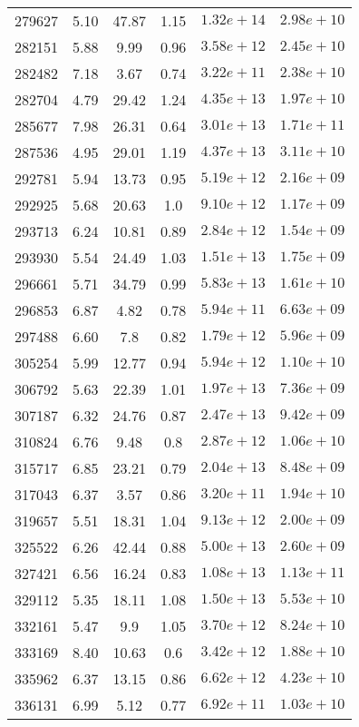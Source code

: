 \begin{table}
\begin{tabular}{cccccc}
279627 & 5.10 & 47.87 & 1.15 & $1.32e+14$ & $2.98e+10$ \\
282151 & 5.88 & 9.99 & 0.96 & $3.58e+12$ & $2.45e+10$ \\
282482 & 7.18 & 3.67 & 0.74 & $3.22e+11$ & $2.38e+10$ \\
282704 & 4.79 & 29.42 & 1.24 & $4.35e+13$ & $1.97e+10$ \\
285677 & 7.98 & 26.31 & 0.64 & $3.01e+13$ & $1.71e+11$ \\
287536 & 4.95 & 29.01 & 1.19 & $4.37e+13$ & $3.11e+10$ \\
292781 & 5.94 & 13.73 & 0.95 & $5.19e+12$ & $2.16e+09$ \\
292925 & 5.68 & 20.63 & 1.0 & $9.10e+12$ & $1.17e+09$ \\
293713 & 6.24 & 10.81 & 0.89 & $2.84e+12$ & $1.54e+09$ \\
293930 & 5.54 & 24.49 & 1.03 & $1.51e+13$ & $1.75e+09$ \\
296661 & 5.71 & 34.79 & 0.99 & $5.83e+13$ & $1.61e+10$ \\
296853 & 6.87 & 4.82 & 0.78 & $5.94e+11$ & $6.63e+09$ \\
297488 & 6.60 & 7.8 & 0.82 & $1.79e+12$ & $5.96e+09$ \\
305254 & 5.99 & 12.77 & 0.94 & $5.94e+12$ & $1.10e+10$ \\
306792 & 5.63 & 22.39 & 1.01 & $1.97e+13$ & $7.36e+09$ \\
307187 & 6.32 & 24.76 & 0.87 & $2.47e+13$ & $9.42e+09$ \\
310824 & 6.76 & 9.48 & 0.8 & $2.87e+12$ & $1.06e+10$ \\
315717 & 6.85 & 23.21 & 0.79 & $2.04e+13$ & $8.48e+09$ \\
317043 & 6.37 & 3.57 & 0.86 & $3.20e+11$ & $1.94e+10$ \\
319657 & 5.51 & 18.31 & 1.04 & $9.13e+12$ & $2.00e+09$ \\
325522 & 6.26 & 42.44 & 0.88 & $5.00e+13$ & $2.60e+09$ \\
327421 & 6.56 & 16.24 & 0.83 & $1.08e+13$ & $1.13e+11$ \\
329112 & 5.35 & 18.11 & 1.08 & $1.50e+13$ & $5.53e+10$ \\
332161 & 5.47 & 9.9 & 1.05 & $3.70e+12$ & $8.24e+10$ \\
333169 & 8.40 & 10.63 & 0.6 & $3.42e+12$ & $1.88e+10$ \\
335962 & 6.37 & 13.15 & 0.86 & $6.62e+12$ & $4.23e+10$ \\
336131 & 6.99 & 5.12 & 0.77 & $6.92e+11$ & $1.03e+10$ \\

\end{tabular}
\end{table}
